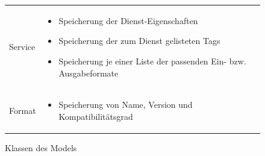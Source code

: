 \begin{figure}[h]
\begin{tabularx}{\textwidth}{p{} | X}
		Service & \begin{itemize}
			\item Speicherung der Dienst-Eigenschaften
			\item Speicherung der zum Dienst gelisteten Tags
			\item Speicherung je einer Liste der passenden Ein- bzw. Ausgabeformate
		\end{itemize} \\
		\rowcolor[HTML]{E7E7E7}
		Format & \begin{itemize}
			\item Speicherung von Name, Version und Kompatibilitätsgrad
		\end{itemize} \\
	\end{tabularx}
	\caption{Klassen des Models}
	\label{table:klassenbeschreibung-a}
\end{figure}

